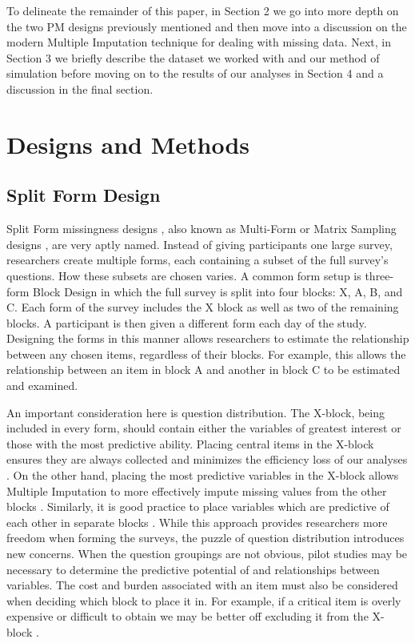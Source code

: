 \documentclass{svjour3}\usepackage[]{graphicx}\usepackage[]{color}
\begin{document}
To delineate the remainder of this paper, in Section 2 we go into more depth on the two PM designs previously mentioned and then move into a discussion on the modern Multiple Imputation technique for dealing with missing data. Next, in Section 3 we briefly describe the dataset we worked with and our method of simulation before moving on to the results of our analyses in Section 4 and a discussion in the final section. \par


\section{Designs and Methods}
\label{sec:1}
\subsection{Split Form Design}
\label{sec:1.1}

Split Form missingness designs \citep{raghunathan1995split}, also  known as Multi-Form \citep{little2013planned} or Matrix Sampling designs \citep{thomas2006evaluation}, are very aptly named. Instead of giving participants one large survey, researchers create multiple forms, each containing a subset of the full survey's questions. How these subsets are chosen varies. A common form setup is three-form Block Design \citep{graham1996maximizing} in which the full survey is split into four blocks: X, A, B, and C. Each form of the survey includes the X block as well as two of the remaining blocks. A participant is then given a different form each day of the study. Designing the forms in this manner allows researchers to estimate the relationship between any chosen items, regardless of their blocks. For example, this allows the relationship between an item in block A and another in block C to be estimated and examined. \par

An important consideration here is question distribution. The X-block, being included in every form, should contain either the variables of greatest interest or those with the most predictive ability.
Placing central items in the X-block ensures they are always collected and minimizes the efficiency loss of our analyses \citep{thomas2006evaluation}. On the other hand, placing the most predictive variables in the X-block allows Multiple Imputation to more effectively impute missing values from the other blocks \citep{gottschall2012comparison}. Similarly, it is good practice to place variables which are predictive of each other in separate blocks \citep{gottschall2012comparison}. While this approach provides researchers more freedom when forming the surveys, the puzzle of question distribution introduces new concerns. When the question groupings are not obvious, pilot studies may be necessary to determine the predictive potential of and relationships between variables. The cost and burden associated with an item must also be considered when deciding which block to place it in. For example, if a critical item is overly expensive or difficult to obtain we may be better off excluding it from the X-block \citep{little2013planned}. \par
\end{document}
